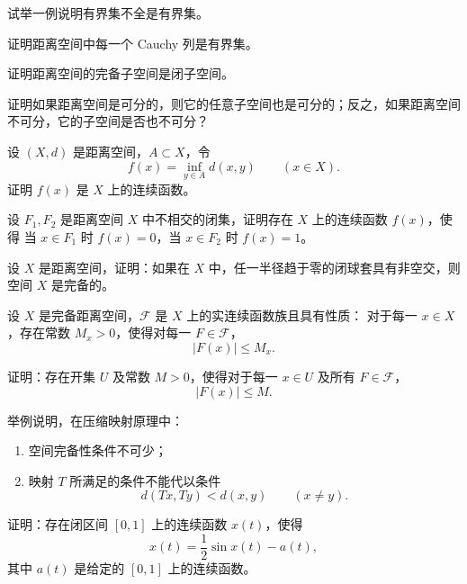 \begin{homework}[1.8]
试举一例说明有界集不全是有界集。
\end{homework}

\begin{homework}[1.9]
证明距离空间中每一个 Cauchy 列是有界集。
\end{homework}

\begin{homework}[1.10]
证明距离空间的完备子空间是闭子空间。
\end{homework}

\begin{homework}[1.11]
证明如果距离空间是可分的，则它的任意子空间也是可分的；反之，如果距离空间不可分，它的子空间是否也不可分？
\end{homework}
\begin{homework}[1.12]
设 $(X,d)$ 是距离空间，$A\subset X$，令
\[
f(x)=\inf_{y\in A} d(x,y) \qquad (x\in X).
\]
证明 $f(x)$ 是 $X$ 上的连续函数。
\end{homework}

\begin{homework}[1.13]
设 $F_1, F_2$ 是距离空间 $X$ 中不相交的闭集，证明存在 $X$ 上的连续函数 $f(x)$，使得
当 $x\in F_1$ 时 $f(x)=0$，当 $x\in F_2$ 时 $f(x)=1$。
\end{homework}

\begin{homework}[1.14]
设 $X$ 是距离空间，证明：如果在 $X$ 中，任一半径趋于零的闭球套具有非空交，则空间 $X$ 是完备的。
\end{homework}

\begin{homework}[1.15]
设 $X$ 是完备距离空间，${\mathcal F}$ 是 $X$ 上的实连续函数族且具有性质：
对于每一 $x\in X$，存在常数 $M_x>0$，使得对每一 $F\in{\mathcal F}$，
\[
|F(x)|\le M_x.
\]

证明：存在开集 $U$ 及常数 $M>0$，使得对于每一 $x\in U$ 及所有 $F\in{\mathcal F}$，
\[
|F(x)|\le M.
\]
\end{homework}
\begin{homework}[1.16]
举例说明，在压缩映射原理中：
\begin{enumerate}
    \item 空间完备性条件不可少；
    \item 映射 $T$ 所满足的条件不能代以条件
    \[
        d(Tx,Ty)<d(x,y)\qquad (x\ne y).
    \]
\end{enumerate}
\end{homework}

\begin{homework}[1.17]
证明：存在闭区间 $[0,1]$ 上的连续函数 $x(t)$，使得
\[
x(t)=\frac12 \sin x(t)-a(t),
\]
其中 $a(t)$ 是给定的 $[0,1]$ 上的连续函数。
\end{homework}

